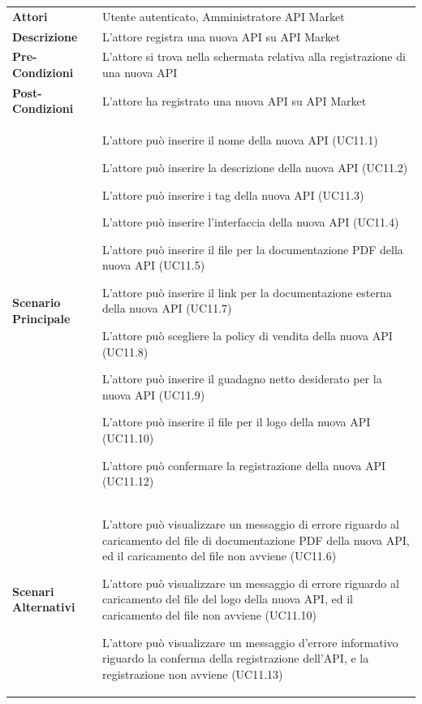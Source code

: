 \begin{longtable}{ l | p{11cm}}
	\hline
	\rowcolor{Gray}
	\multicolumn{2}{c}{UC11 - Registrazione nuova API}\\
	\hline
	\textbf{Attori} & Utente autenticato, Amministratore API Market \\
	\textbf{Descrizione} & L'attore registra una nuova API su API Market \\
	\textbf{Pre-Condizioni} & L'attore si trova nella schermata relativa alla registrazione di una nuova API \\
	\textbf{Post-Condizioni} & L'attore ha registrato una nuova API su API Market \\
	\textbf{Scenario Principale} & 
	\begin{enumerate*}[label=(\arabic*.),itemjoin={\newline}]
		\item L'attore può inserire il nome della nuova API (UC11.1)
		\item L'attore può inserire la descrizione della nuova API (UC11.2)
		\item L'attore può inserire i tag della nuova API (UC11.3)
		\item L'attore può inserire l'interfaccia della nuova API (UC11.4)
		\item L'attore può inserire il file per la documentazione PDF della nuova API (UC11.5)
		\item L'attore può inserire il link per la documentazione esterna della nuova API (UC11.7)
		\item L'attore può scegliere la policy di vendita della nuova API (UC11.8)
		\item L'attore può inserire il guadagno netto desiderato per la nuova API (UC11.9)
		\item L'attore può inserire il file per il logo della nuova API (UC11.10)
		\item L'attore può confermare la registrazione della nuova API (UC11.12)
	\end{enumerate*}\\
	\textbf{Scenari Alternativi} & 
	\begin{enumerate*}[label=(\arabic*.),itemjoin={\newline}]
			\item L'attore può visualizzare un messaggio di errore riguardo al caricamento del file di documentazione PDF della nuova API, ed il caricamento del file non avviene (UC11.6)
			\item L'attore può visualizzare un messaggio di errore riguardo al caricamento del file del logo della nuova API, ed il caricamento del file non avviene (UC11.10)
			\item L'attore può visualizzare un messaggio d'errore informativo riguardo la conferma della registrazione dell'API, e la registrazione non avviene (UC11.13)
	\end{enumerate*}\\
\end{longtable}

